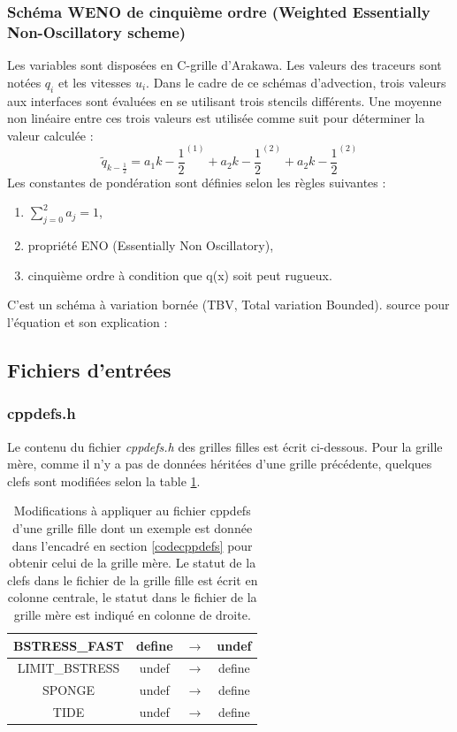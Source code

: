 \documentclass[10pt,a4paper,titlepage]{article}
\begin{document}
\subsubsection{Schéma WENO de cinquième ordre (Weighted Essentially Non-Oscillatory scheme)}\label{anx:WENO}
Les variables sont disposées en C-grille d'Arakawa.
Les valeurs des traceurs sont notées $q_i$ et les vitesses $u_i$.
Dans le cadre de ce schémas d'advection, trois valeurs aux interfaces sont évaluées en se utilisant trois stencils différents. Une moyenne non linéaire entre ces trois valeurs est utilisée comme suit pour déterminer la valeur calculée :
$$\tilde{q}_{k-\frac{1}{2}} = a_1k-\frac{1}{2}^{(1)} + a_2k-\frac{1}{2}^{(2)} + a_2k-\frac{1}{2}^{(2)}$$
Les constantes de pondération sont définies selon les règles suivantes :
\begin{enumerate}
    \item $\sum_{j=0}^{2}a_j = 1$,
    \item propriété ENO (Essentially Non Oscillatory),
    \item cinquième ordre à condition que q(x) soit peut rugueux.
\end{enumerate}
C'est un schéma à variation bornée (TBV, Total variation Bounded).
source pour l'équation et son explication : \cite{schemas_advection}


\subsection{Fichiers d'entrées}
\subsubsection{cppdefs.h}
\label{anx:cppdefs}
Le contenu du fichier \textit{cppdefs.h} des grilles filles est écrit ci-dessous. Pour la grille mère, comme il n'y a pas de données héritées d'une grille précédente, quelques clefs sont modifiées selon la table \ref{table:cppdefs_mere}.

\begin{table}[h!]
    \centering
    \begin{tabular}{c | c c c}
        BSTRESS\_FAST & define & $\rightarrow$ & {\color{red}undef}\\
        \hline
        LIMIT\_BSTRESS & undef & $\rightarrow$ & {\color{green}define}\\
        \hline
        SPONGE & undef & $\rightarrow$ & {\color{green}define}\\
        \hline
        TIDE & undef & $\rightarrow$ & {\color{green}define}\\
    \end{tabular}
    \caption{
        Modifications à appliquer au fichier cppdefs d'une grille fille dont un exemple est donnée dans l'encadré en section \ref{codecppdefs} pour obtenir celui de la grille mère.
        Le statut de la clefs dans le fichier de la grille fille est écrit en colonne centrale, le statut dans le fichier de la grille mère est indiqué en colonne de droite.
    }
    \label{table:cppdefs_mere}
\end{table}
\end{document}
